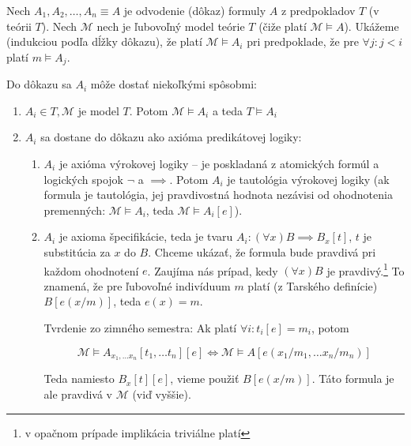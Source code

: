 \begin{dokaz}
    Nech $A_1, A_2, \ldots, A_n\equiv A$ je odvodenie (dôkaz) formuly $A$
    z predpokladov $T$ (v teórii $T$).
    Nech $\mathcal{M}$ nech je ľubovoľný model teórie $T$ 
    (čiže platí $\mathcal{M} \models A$).
    Ukážeme (indukciou podľa dĺžky dôkazu), že platí $\mathcal{M} \models A_i$
    pri predpoklade, že pre $\forall j:j < i$ platí $m \models A_j$.

    Do dôkazu sa $A_i$ môže dostať niekoľkými spôsobmi:
    \begin{enumerate}
    \item $A_i \in T, \mathcal{M}$ je model $T$. Potom 
        $\mathcal{M} \models A_i$ a teda $T \models A_i$

    \item $A_i$ sa dostane do dôkazu ako axióma predikátovej logiky:
    \begin{enumerate}
        \item $A_i$ je axióma výrokovej logiky -- je poskladaná z
            atomických formúl a logických spojok $\neg$ a $\implies$. Potom
            $A_i$ je tautológia výrokovej logiky (ak formula je tautológia,
            jej pravdivostná hodnota nezávisi od ohodnotenia
            premenných:
            $\mathcal{M} \models A_i$, teda $\mathcal{M} \models A_i[e]$).

        \item $A_i$ je axioma špecifikácie, teda je tvaru 
            $A_i: (\forall x) B \implies B_x[t]$, 
            $t$ je substitúcia za $x$ do $B$. 
            Chceme ukázať, že formula bude pravdivá
            pri každom ohodnotení $e$.
            Zaujíma nás prípad, kedy $(\forall x) B$ je pravdivý.\footnote{
                v opačnom prípade implikácia triviálne platí}
            To znamená, že pre ľubovoľné indivíduum $m$ platí (z Tarského
            definície) $B[e(x/m)]$, teda $e(x)=m$.
        
            Tvrdenie zo zimného semestra: Ak platí
              $\forall i: t_i[e] = m_i$, potom

            \begin{equation*}
                \mathcal{M} \models A_{x_1, \ldots x_n}[t_1, \ldots t_n][e] 
                    \iff
                \mathcal{M} \models A[e(x_1/m_1, \ldots x_n/m_n)]
            \end{equation*}

            Teda namiesto $B_x[t][e]$, vieme použiť $B[e(x/m)]$.
            Táto formula je ale pravdivá v $\mathcal{M}$ (viď vyššie).


\end{enumerate}
\end{enumerate}
\end{dokaz}
